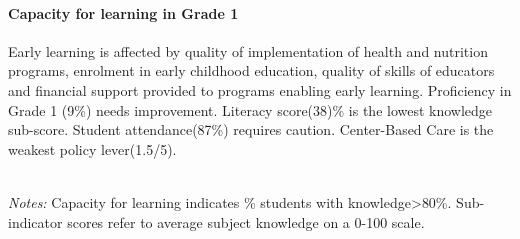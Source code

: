\documentclass[
]{article}
\begin{document}
\hypertarget{capacity-for-learning-in-grade-1}{%
\paragraph{\texorpdfstring{\textbf{Capacity for learning in Grade
1}}{Capacity for learning in Grade 1}}\label{capacity-for-learning-in-grade-1}}

Early learning is affected by quality of implementation of health and
nutrition programs, enrolment in early childhood education, quality of
skills of educators and financial support provided to programs enabling
early learning. Proficiency in Grade 1 (9\%) needs improvement. Literacy
score(38)\% is the lowest knowledge sub-score. Student attendance(87\%)
requires caution. Center-Based Care is the weakest policy lever(1.5/5).

\begin{table}[H]
\\
\color{darkgray}\scriptsize{\textit{Notes:} Capacity for learning indicates \% students with knowledge\textgreater{80\%}. Sub-indicator scores refer to average subject knowledge on a 0-100 scale.}
\end{table}
\raggedbottom
\end{document}

